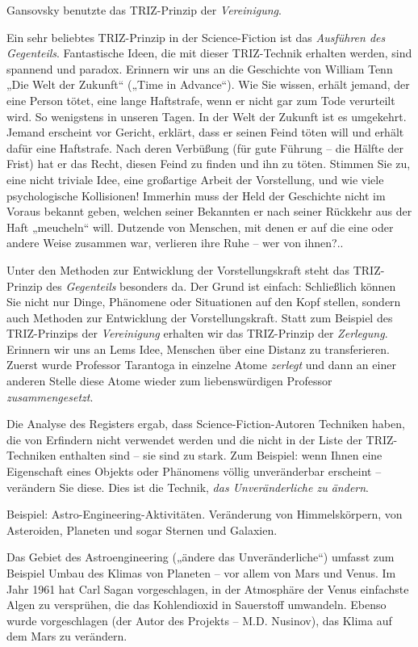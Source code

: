 \documentclass[11pt,a4paper]{article}
\begin{document}
Gansovsky benutzte das TRIZ-Prinzip der \emph{Vereinigung}.

Ein sehr beliebtes TRIZ-Prinzip in der Science-Fiction ist das \emph{Ausführen
  des Gegenteils}. Fantastische Ideen, die mit dieser TRIZ-Technik erhalten
werden, sind spannend und paradox. Erinnern wir uns an die Geschichte von
William Tenn „Die Welt der Zukunft“ („Time in Advance“). Wie Sie wissen,
erhält jemand, der eine Person tötet, eine lange Haftstrafe, wenn er nicht gar
zum Tode verurteilt wird.  So wenigstens in unseren Tagen.  In der Welt der
Zukunft ist es umgekehrt. Jemand erscheint vor Gericht, erklärt, dass er
seinen Feind töten will und erhält dafür eine Haftstrafe. Nach deren Verbüßung
(für gute Führung -- die Hälfte der Frist) hat er das Recht, diesen Feind zu
finden und ihn zu töten. Stimmen Sie zu, eine nicht triviale Idee, eine
großartige Arbeit der Vorstellung, und wie viele psychologische Kollisionen!
Immerhin muss der Held der Geschichte nicht im Voraus bekannt geben, welchen
seiner Bekannten er nach seiner Rückkehr aus der Haft „meucheln“ will.
Dutzende von Menschen, mit denen er auf die eine oder andere Weise zusammen
war, verlieren ihre Ruhe -- wer von ihnen?..

Unter den Methoden zur Entwicklung der Vorstellungskraft steht das
TRIZ-Prinzip des \emph{Gegenteils} besonders da. Der Grund ist einfach:
Schließlich können Sie nicht nur Dinge, Phänomene oder Situationen auf den
Kopf stellen, sondern auch Methoden zur Entwicklung der Vorstellungskraft.
Statt zum Beispiel des TRIZ-Prinzips der \emph{Vereinigung} erhalten wir das
TRIZ-Prinzip der \emph{Zerlegung}. Erinnern wir uns an Lems Idee, Menschen
über eine Distanz zu transferieren. Zuerst wurde Professor Tarantoga in
einzelne Atome \emph{zerlegt} und dann an einer anderen Stelle diese Atome
wieder zum liebenswürdigen Professor \emph{zusammengesetzt}.

Die Analyse des Registers ergab, dass Science-Fiction-Autoren Techniken haben,
die von Erfindern nicht verwendet werden und die nicht in der Liste der
TRIZ-Techniken enthalten sind -- sie sind zu stark. Zum Beispiel: wenn Ihnen
eine Eigenschaft eines Objekts oder Phänomens völlig unveränderbar erscheint
-- verändern Sie diese. Dies ist die Technik, \emph{das Unveränderliche zu
  ändern}.

Beispiel: Astro-Engineering-Aktivitäten. Veränderung von Himmelskörpern, von
Asteroiden, Planeten und sogar Sternen und Galaxien.

Das Gebiet des Astroengineering („ändere das Unveränderliche“) umfasst zum
Beispiel Umbau des Klimas von Planeten -- vor allem von Mars und Venus. Im
Jahr 1961 hat Carl Sagan vorgeschlagen, in der Atmosphäre der Venus einfachste
Algen zu versprühen, die das Kohlendioxid in Sauerstoff umwandeln. Ebenso
wurde vorgeschlagen (der Autor des Projekts -- M.D. Nusinov), das Klima auf
dem Mars zu verändern.
\end{document}
